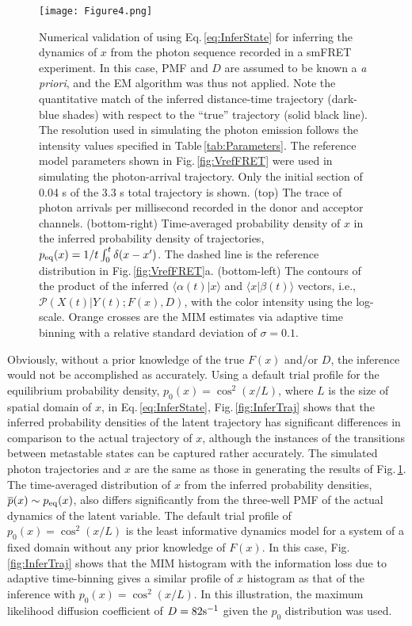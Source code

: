 \documentclass[journal=jpcbfk,manuscript=article,layout=twocolumn,articletitle=true]{achemso}
\begin{document}
\begin{figure}[t!]
\centering
\texttt{[image: Figure4.png]}
\caption[Contours of reference trajectory from smFRET]{\label{fig:InferTrajref} Numerical validation of using Eq.\,\ref{eq:InferState} for inferring the dynamics of $x$ from the photon sequence recorded in a smFRET experiment. In this case, PMF and $D$ are assumed to be known a {\it a priori}, and the EM algorithm was thus not applied. Note the quantitative match of the inferred distance-time trajectory (dark-blue shades) with respect to the ``true'' trajectory (solid black line). The resolution used in simulating the photon emission follows the intensity values specified in Table\,\ref{tab:Parameters}. The reference model parameters shown in Fig.\,\ref{fig:VrefFRET} were used in simulating the photon-arrival trajectory. Only the initial section of 0.04 s of the 3.3 s total trajectory is shown. (top) The trace of photon arrivals per millisecond recorded in the donor and acceptor channels. (bottom-right) Time-averaged probability density of $x$ in the inferred probability density of trajectories, $p_{\rm{eq}}(x) = 1/t \int_0^{t} \delta(x - x')$. The dashed line is the reference distribution in Fig.\,\ref{fig:VrefFRET}a. (bottom-left)  The contours of the product of the inferred $\langle \alpha(t) | x \rangle$ and $\langle x | \beta(t) \rangle$ vectors, i.e., $\mathcal{P}(X(t)|Y(t); F(x), D)$, with the color intensity using the log-scale. Orange crosses are the MIM estimates via adaptive time binning with a relative standard deviation of $\sigma=0.1$.\cite{Watkins:2004cia,Watkins:2006bu}}
\end{figure}

Obviously, without a prior knowledge of the true $F(x)$ and/or $D$, the inference would not be accomplished as accurately. Using a default trial profile for the equilibrium probability density, $p_0(x) = \cos^2(x/L)$, where $L$ is the size of spatial domain of $x$, in Eq.\,\ref{eq:InferState}, Fig.\,\ref{fig:InferTraj} shows that the inferred probability densities of the latent trajectory has significant differences in comparison to the actual trajectory of $x$, although the instances of the transitions between metastable states can be captured rather accurately. The simulated photon trajectories and $x$ are the same as those in generating the results of Fig.\,\ref{fig:InferTrajref}. The time-averaged distribution of $x$ from the inferred probability densities, $\overline{p}(x) \sim p_{\rm{eq}}(x)$, also differs significantly from the three-well PMF of the actual dynamics of the latent variable. The default trial profile of $p_0(x) = \cos^2(x/L)$ is the least informative dynamics model for a system of a fixed domain without any prior knowledge of $F(x)$.\cite{Haas:2013uj} In this case, Fig.\,\ref{fig:InferTraj} shows that the MIM histogram with the information loss due to adaptive time-binning gives a similar profile of $x$ histogram as that of the inference with $p_0(x) = \cos^2(x/L)$. In this illustration, the maximum likelihood diffusion coefficient of $D=82 \rm s^{-1}$ given the $p_0$ distribution was used.
\end{document}

